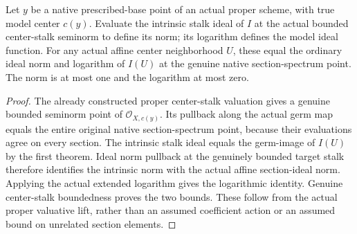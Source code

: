 \begin{definition}
\label{scheme:native-model-ideal-function}
\leanok
{}
Let $y$ be a native prescribed-base point of an actual proper scheme,
with true model center $c(y)$. Evaluate the intrinsic stalk ideal of $I$
at the actual bounded center-stalk seminorm to define its norm; its
logarithm defines the model ideal function. For any actual affine center
neighborhood $U$, these equal the ordinary ideal norm and logarithm of
$I(U)$ at the genuine native section-spectrum point. The norm is at most
one and the logarithm at most zero.
\end{definition}
\begin{proof}
The already constructed proper center-stalk valuation gives a genuine
bounded seminorm point of $\mathcal O_{X,c(y)}$. Its pullback along the
actual germ map equals the entire original native section-spectrum
point, because their evaluations agree on every section. The intrinsic
stalk ideal equals the germ-image of $I(U)$ by the first theorem. Ideal
norm pullback at the genuinely bounded target stalk therefore identifies
the intrinsic norm with the actual affine section-ideal norm. Applying
the actual extended logarithm gives the logarithmic identity. Genuine
center-stalk boundedness proves the two bounds. These follow from the
actual proper valuative lift, rather than an assumed coefficient action
or an assumed bound on unrelated section elements.
\end{proof}

